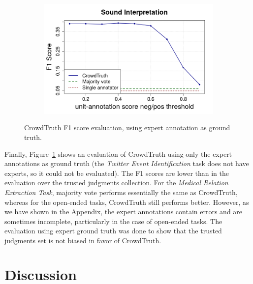 \begin{figure}[!tbh]
\begin{subfigure}{.5\textwidth}
\end{subfigure}%
\begin{subfigure}{.5\textwidth}
\includegraphics[width=\linewidth]{img/exp_eval_sounds.png}
\end{subfigure}
\caption{CrowdTruth F1 score evaluation, using expert annotation as ground truth.}
\label{fig:f1_exp}
\end{figure}

Finally, Figure~\ref{fig:f1_exp} shows an evaluation of CrowdTruth using only the expert annotations as ground truth (the \textit{Twitter Event Identification} task does not have experts, so it could not be evaluated). The F1 scores are lower than in the evaluation over the trusted judgments collection. For the \textit{Medical Relation Extraction Task}, majority vote performs essentially the same as CrowdTruth, whereas for the open-ended tasks, CrowdTruth still performs better. However, as we have shown in the Appendix, the expert annotations contain errors and are sometimes incomplete, particularly in the case of open-ended tasks. The evaluation using expert ground truth was done to show that the trusted judgments set is not biased in favor of CrowdTruth.


\section{Discussion}
\label{sec:discussion}

